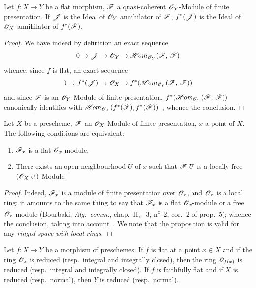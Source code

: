 \begin{proposition}[2.1.11]
\label{IV.2.1.11}
Let $f:X\to Y$ be a flat morphism, $\mathscr{F}$ a quasi-coherent $\mathscr{O}_Y$-Module of finite presentation.
If $\mathscr{J}$ is the Ideal of $\mathscr{O}_Y$ annihilator of $\mathscr{F}$, $f^*(\mathscr{J})$ is the Ideal of $\mathscr{O}_X$ annihilator of $f^*(\mathscr{F})$.
\end{proposition}

\begin{proof}
We have indeed by definition an exact sequence~
\[
  0\to\mathscr{J}\to\mathscr{O}_Y\to\mathscr{H}\!\mathit{om}_{\mathscr{O}_Y}(\mathscr{F},\,\mathscr{F})
\]
whence, since $f$ is flat, an exact sequence
\[
  0\to f^*(\mathscr{J})\to\mathscr{O}_X\to f^*(\mathscr{H}\!\mathit{om}_{\mathscr{O}_Y}(\mathscr{F},\,\mathscr{F}))
\]
and since $\mathscr{F}$ is an $\mathscr{O}_Y$-Module of finite presentation, $f^*(\mathscr{H}\!\mathit{om}_{\mathscr{O}_Y}(\mathscr{F},\,\mathscr{F}))$ canonically identifies with $\mathscr{H}\!\mathit{om}_{\mathscr{O}_X}(f^*(\mathscr{F}),f^*(\mathscr{F}))$~, whence the conclusion.
\end{proof}

\begin{proposition}[2.1.12]
\label{IV.2.1.12}
Let $X$ be a prescheme, $\mathscr{F}$ an $\mathscr{O}_X$-Module of finite presentation, $x$ a point of $X$.
The following conditions are equivalent:
\begin{enumerate}
  \item[\emph{a)}] $\mathscr{F}_x$ is a flat $\mathscr{O}_x$-module.
  \item[\emph{b)}] There exists an open neighbourhood $U$ of $x$ such that $\mathscr{F}|U$ is a locally free $(\mathscr{O}_X|U)$-Module.
\end{enumerate}
\end{proposition}

\begin{proof}
Indeed, $\mathscr{F}_x$ is a module of finite presentation over $\mathscr{O}_x$, and $\mathscr{O}_x$ is a local ring; it amounts to the same thing to say that $\mathscr{F}_x$ is a flat $\mathscr{O}_x$-module or a free $\mathscr{O}_x$-module (Bourbaki, \emph{Alg.~comm.}, chap.~II, \textsection~3, n\textsuperscript{o}~2, cor.~2 of prop.~5); whence the conclusion, taking into account~.
We note that the proposition is valid for any \emph{ringed space with local rings}.
\end{proof}

\begin{proposition}[2.1.13]
\label{IV.2.1.13}
Let $f:X\to Y$ be a morphism of preschemes. If $f$ is flat at a point $x\in X$ and if the ring $\mathscr{O}_x$ is reduced \textnormal{(}resp.\ integral and integrally closed\textnormal{)}, then the ring $\mathscr{O}_{f(x)}$
is reduced \textnormal{(}resp.\ integral and integrally closed\textnormal{)}.
If $f$ is faithfully flat and if $X$ is reduced \textnormal{(}resp.\ normal\textnormal{)}, then $Y$ is reduced \textnormal{(}resp.\ normal\textnormal{)}.
\end{proposition}


